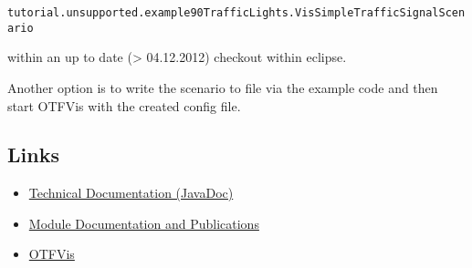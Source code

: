 \texttt{\nolinebreak  tutorial.unsupported.example90TrafficLights.VisSimpleTrafficSignalScenario }

within an up to date (> 04.12.2012) checkout within eclipse.

Another option is to write the scenario to file via the example code and then start OTFVis with the created config file.

\subsection{Links}
\begin{itemize}
	\item \href{http://ci.matsim.org:8080/job/MATSim_M2/javadoc/org/matsim/signalsystems/package-summary.html}{Technical Documentation (JavaDoc)}
	\item \href{http://matsim.org/node/384}{Module Documentation and Publications}
	\item \href{http://matsim.org/node/693}{OTFVis}
\end{itemize}


\texttt{\nolinebreak  }




\texttt{\nolinebreak  }
